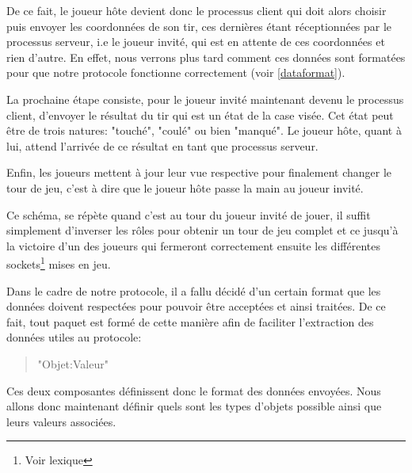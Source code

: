 			De ce fait, le joueur hôte devient donc le processus client qui doit alors choisir puis envoyer les coordonnées de son tir, ces dernières étant réceptionnées par le processus serveur, i.e le joueur invité, qui est en attente de ces coordonnées et rien d'autre. En effet, nous verrons plus tard comment ces données sont formatées pour que notre protocole fonctionne correctement (voir \ref{dataformat}).  \newline
			
			La prochaine étape consiste, pour le joueur invité maintenant devenu le processus client, d'envoyer le résultat du tir qui est un état de la case visée. Cet état peut être de trois natures: "touché", "coulé" ou bien "manqué". Le joueur hôte, quant à lui, attend l'arrivée de ce résultat en tant que processus serveur.\newline \label{states}
			
			Enfin, les joueurs mettent à jour leur vue respective pour finalement changer le tour de jeu, c'est à dire que le joueur hôte passe la main au joueur invité. \newline
			
			Ce schéma, se répète quand c'est au tour du joueur invité de jouer, il suffit simplement d'inverser les rôles pour obtenir un tour de jeu complet et ce jusqu'à la victoire d'un des joueurs qui fermeront correctement ensuite les différentes sockets\footnote{Voir lexique} mises en jeu.
			
		\label{dataformat}
			Dans le cadre de notre protocole, il a fallu décidé d'un certain format que les données doivent respectées pour pouvoir être acceptées et ainsi traitées. De ce fait, tout paquet est formé de cette manière afin de faciliter l'extraction des données utiles au protocole:
			\begin{quote}
				"Objet:Valeur"
			\end{quote}
			Ces deux composantes définissent donc le format des données envoyées. Nous allons donc maintenant définir quels sont les types d'objets possible ainsi que leurs valeurs associées.
			
